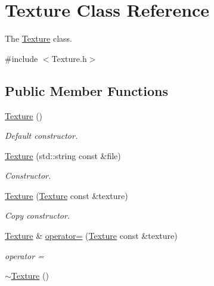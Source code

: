 \hypertarget{classTexture}{}\section{Texture Class Reference}
\label{classTexture}


The \hyperlink{classTexture}{Texture} class.  




{\ttfamily \#include $<$Texture.\+h$>$}

\subsection*{Public Member Functions}
\begin{DoxyCompactItemize}
\item 
\hypertarget{classTexture_a6c275e3f186675ff6ed73ccf970e552f}{}\hyperlink{classTexture_a6c275e3f186675ff6ed73ccf970e552f}{Texture} ()\label{classTexture_a6c275e3f186675ff6ed73ccf970e552f}

\begin{DoxyCompactList}\small\item\em Default constructor. \end{DoxyCompactList}\item 
\hyperlink{classTexture_a93d4d7c41898028b54b1ea8d09e4eb4d}{Texture} (std\+::string const \&file)
\begin{DoxyCompactList}\small\item\em Constructor. \end{DoxyCompactList}\item 
\hyperlink{classTexture_a1c6655d1e07186cb84e30528a8a5e4e6}{Texture} (\hyperlink{classTexture}{Texture} const \&texture)
\begin{DoxyCompactList}\small\item\em Copy constructor. \end{DoxyCompactList}\item 
\hyperlink{classTexture}{Texture} \& \hyperlink{classTexture_ab67757726d23554fc006316b2643dd6a}{operator=} (\hyperlink{classTexture}{Texture} const \&texture)
\begin{DoxyCompactList}\small\item\em operator = \end{DoxyCompactList}\item 
\hypertarget{classTexture_a09c4bcb7462f64c1d20fa69dba3cee8a}{}\hyperlink{classTexture_a09c4bcb7462f64c1d20fa69dba3cee8a}{$\sim$\+Texture} ()\label{classTexture_a09c4bcb7462f64c1d20fa69dba3cee8a}


\end{DoxyCompactItemize}
